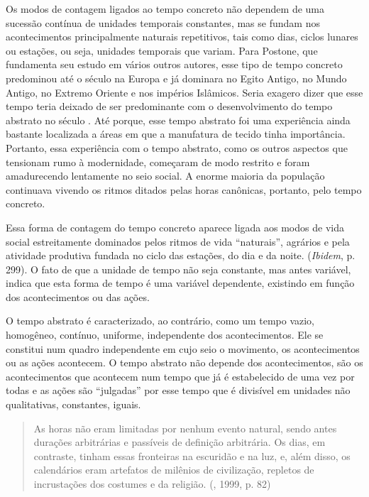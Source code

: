 Os modos de contagem ligados ao tempo concreto não dependem de uma
sucessão contínua de unidades temporais constantes, mas se fundam nos
acontecimentos principalmente naturais repetitivos, tais como dias,
ciclos lunares ou estações, ou seja, unidades temporais que variam. Para
Postone, que fundamenta seu estudo em vários outros autores, esse tipo
de tempo concreto predominou até o século  na Europa e já dominara no
Egito Antigo, no Mundo Antigo, no Extremo Oriente e nos impérios
Islâmicos. Seria exagero dizer que esse tempo teria deixado de ser
predominante com o desenvolvimento do tempo abstrato no século . Até
porque, esse tempo abstrato foi uma experiência ainda bastante
localizada a áreas em que a manufatura de tecido tinha importância.
Portanto, essa experiência com o tempo abstrato, como os outros aspectos
que tensionam rumo à modernidade, começaram de modo restrito e foram
amadurecendo lentamente no seio social. A enorme maioria da população
continuava vivendo os ritmos ditados pelas horas canônicas, portanto,
pelo tempo concreto.

Essa forma de contagem do tempo concreto aparece ligada aos modos de
vida social estreitamente dominados pelos ritmos de vida ``naturais'',
agrários e pela atividade produtiva fundada no ciclo das estações, do
dia e da noite. (\emph{Ibidem}, p. 299). O fato de que a unidade de
tempo não seja constante, mas antes variável, indica que esta forma de
tempo é uma variável dependente, existindo em função dos acontecimentos
ou das ações.

O tempo abstrato é caracterizado, ao contrário, como um tempo vazio,
homogêneo, contínuo, uniforme, independente dos acontecimentos. Ele se
constitui num quadro independente em cujo seio o movimento, os
acontecimentos ou as ações acontecem. O tempo abstrato não depende dos
acontecimentos, são os acontecimentos que acontecem num tempo que já é
estabelecido de uma vez por todas e as ações são ``julgadas'' por esse
tempo que é divisível em unidades não qualitativas, constantes, iguais.

\begin{quote}
As horas não eram limitadas por nenhum evento natural, sendo antes
durações arbitrárias e passíveis de definição arbitrária. Os dias, em
contraste, tinham essas fronteiras na escuridão e na luz, e, além disso,
os calendários eram artefatos de milênios de civilização, repletos de
incrustações dos costumes e da religião. (, 1999, p. 82)
\end{quote}

